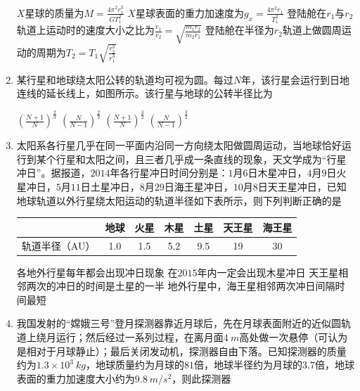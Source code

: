 \begin{enumerate}[leftmargin=0em]
\fourchoices
{$ X $星球的质量为$M = \frac { 4 \pi ^ { 2 } r _ { 1 } ^ { 3 } } { G T _ { 1 } ^ { 2 } }$}
{$ X $星球表面的重力加速度为$g _ { x } = \frac { 4 \pi ^ { 2 } r _ { 1 } } { T _ { 1 } ^ { 2 } }$}
{登陆舱在$ r_{1} $与$ r_{2} $轨道上运动时的速度大小之比为$\frac { v _ { 1 } } { v _ { 2 } } = \sqrt { \frac { m _ { 1 } r _ { 2 } } { m _ { 2 } r _ { 1 } } }$}
{登陆舱在半径为$ r_{2} $轨道上做圆周运动的周期为$T _ { 2 } = T _ { 1 } \sqrt { \frac { r _ { 2 } ^ { 3 } } { r _ { 1 } ^ { 3 } } }$}



\item 
{}
某行星和地球绕太阳公转的轨道均可视为圆。每过$ N $年，该行星会运行到日地连线的延长线上，如图所示。该行星与地球的公转半径比为  
\begin{figure}[h!]
\centering

\end{figure}

\fourchoices
{$ \left( \frac { N + 1 } { N } \right) ^ { \frac { 2 } { 3 } } $}
{$ \left( \frac { N } { N - 1 } \right) ^ { \frac { 2 } { 3 } } $}
{$ \left( \frac { N + 1 } { N } \right) ^ { \frac { 3 } { 2 } } $}
{$ \left( \frac { N } { N - 1 } \right) ^ { \frac { 3 } { 2 } } $}

\item 
{}
太阳系各行星几乎在同一平面内沿同一方向绕太阳做圆周运动，当地球恰好运行到某个行星和太阳之间，且三者几乎成一条直线的现象，天文学成为“行星冲日”。据报道，$ 2014 $年各行星冲日时间分别是：$ 1 $月$ 6 $日木星冲日，$ 4 $月$ 9 $日火星冲日，$ 5 $月$ 11 $日土星冲日，$ 8 $月$ 29 $日海王星冲日，$ 10 $月$ 8 $日天王星冲日，已知地球轨道以外行星绕太阳运动的轨道半径如下表所示，则下列判断正确的是  
\begin{table}[h!]
\centering 
\begin{tabular}{|c|c|c|c|c|c|c|}
\hline 
& 地球 & 火星 & 木星 & 土星 & 天王星 & 海王星
 \\
\hline
轨道半径（AU） & 1.0 & 1.5 & 5.2 & 9.5 & 19 & 30\\ 
\hline 
\end{tabular}
\end{table} 

\fourchoices
{各地外行星每年都会出现冲日现象}
{在$ 2015 $年内一定会出现木星冲日}
{天王星相邻两次的冲日的时间是土星的一半}
{地外行星中，海王星相邻两次冲日间隔时间最短}




\item 
{}
我国发射的“嫦娥三号”登月探测器靠近月球后，先在月球表面附近的近似圆轨道上绕月运行；然后经过一系列过程，在离月面$ 4 \ m $高处做一次悬停（可认为是相对于月球静止）；最后关闭发动机，探测器自由下落。已知探测器的质量约为$ 1.3 \times 10^3 \ kg $，地球质量约为月球的$ 81 $倍，地球半径约为月球的$ 3.7 $倍，地球表面的重力加速度大小约为$ 9.8 \ m/s^{2} $，则此探测器  


\end{enumerate}
